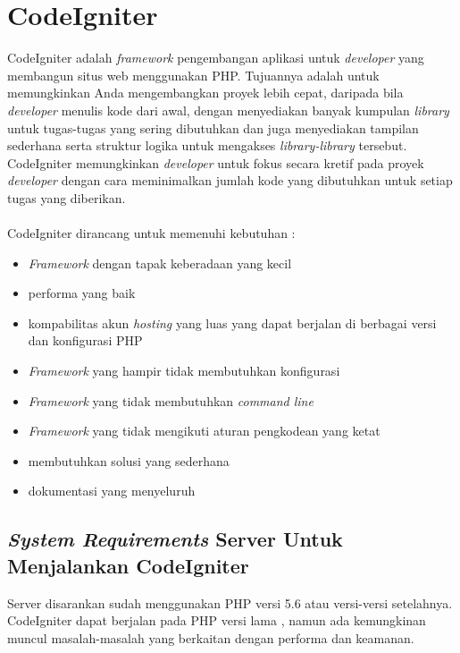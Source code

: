 \section{CodeIgniter}
\label{sec:CodeIgniter}  
CodeIgniter adalah \textit{framework} pengembangan aplikasi untuk \textit{developer} yang membangun situs web menggunakan PHP. Tujuannya adalah untuk memungkinkan Anda mengembangkan proyek lebih cepat, daripada bila \textit{developer} menulis kode dari awal, dengan menyediakan banyak kumpulan \textit{library} untuk tugas-tugas yang sering dibutuhkan dan juga menyediakan tampilan sederhana serta struktur logika untuk mengakses \textit{library-library} tersebut. CodeIgniter memungkinkan \textit{developer} untuk fokus secara kretif pada proyek \textit{developer} dengan cara meminimalkan jumlah kode yang dibutuhkan untuk setiap tugas yang diberikan. \cite{CodeIgniter:17}
\\
\\
CodeIgniter dirancang untuk memenuhi kebutuhan :
\begin{itemize}
		\item \textit{Framework} dengan tapak keberadaan yang kecil
		\item performa yang baik
		\item kompabilitas akun \textit{hosting} yang luas yang dapat berjalan di berbagai versi dan konfigurasi PHP
		\item \textit{Framework} yang hampir tidak membutuhkan konfigurasi
		\item \textit{Framework} yang tidak membutuhkan \textit{command line}
		\item \textit{Framework} yang tidak mengikuti aturan pengkodean yang ketat
		\item membutuhkan solusi yang sederhana
		\item dokumentasi yang menyeluruh
	\end{itemize}
	
\subsection{\textit{System Requirements} Server Untuk Menjalankan CodeIgniter}
Server disarankan sudah menggunakan PHP versi 5.6 atau versi-versi setelahnya. CodeIgniter dapat berjalan pada PHP versi lama , namun ada kemungkinan muncul masalah-masalah yang berkaitan dengan performa dan keamanan. \cite{CodeIgniter:17}

